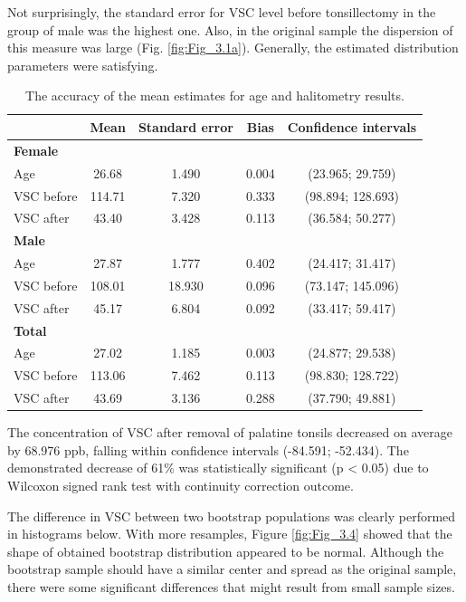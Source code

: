 \documentclass[12pt,a4paper,notitlepage]{report}
\begin{document}
Not surprisingly, the standard error for VSC level before tonsillectomy in the group of male was the highest one. Also, in the original sample the dispersion of this measure was large (Fig. \ref{fig:Fig_3.1a}). Generally, the estimated distribution parameters were satisfying.

\begin{table}[H]
\centering
	\begin{tabular}{lcccc}
	\hline 		 		& \textbf{Mean} 	& \textbf{Standard error} & \textbf{Bias} &  \textbf{Confidence intervals} \\
	\hline
	\hline
	\bf{Female}				&			&			&				&					\\
	\indent Age				& 26.68		& 1.490		& 0.004			& (23.965; 29.759)		\\
	\indent VSC before			& 114.71		& 7.320		& 0.333			& (98.894; 128.693)		\\
	\indent VSC after			& 43.40		& 3.428		& 0.113			& (36.584; 50.277)		\\
	\hline
	
	\bf{Male} 					&			&			&				&					\\
	\indent Age				& 27.87		& 1.777		& 0.402			& (24.417; 31.417)		\\
	\indent VSC before			& 108.01		& 18.930		& 0.096			& (73.147; 145.096)		\\
	\indent VSC after			& 45.17		& 6.804		& 0.092			& (33.417; 59.417)		\\
	\hline
	
	\bf{Total} 				&			&			&				&					\\
	\indent Age				& 27.02		& 1.185		& 0.003			& (24.877; 29.538)		\\
	\indent VSC before			& 113.06		& 7.462		& 0.113			& (98.830; 128.722)		\\
	\indent VSC after			& 43.69		& 3.136		& 0.288			& (37.790; 49.881)		\\
	\hline
	\end{tabular} 
	\caption{The accuracy of the mean estimates for age and halitometry results.}
	\label{tab:Estimates_accuracy}
\end{table}

The concentration of VSC after removal of palatine tonsils decreased on average by 68.976 ppb, falling within confidence intervals (-84.591; -52.434).
The demonstrated decrease of 61\% was statistically significant (p < 0.05) due to Wilcoxon signed rank test with continuity correction outcome. 

The difference in VSC between two bootstrap populations was clearly performed in histograms below. With more resamples, Figure \ref{fig:Fig_3.4}  showed that the shape of obtained bootstrap distribution appeared to be normal. Although the bootstrap sample should have a similar center and spread as the original sample, there were some significant differences that might result from small sample sizes.
\end{document}

